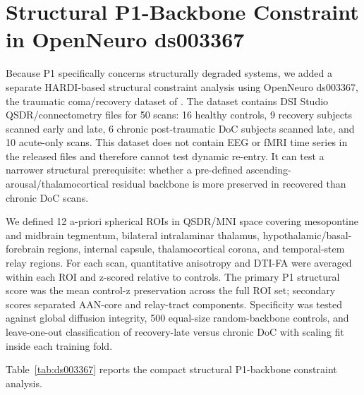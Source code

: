 \documentclass[11pt,a4paper]{article}
\theoremstyle{plain}
\theoremstyle{definition}
\theoremstyle{remark}
\begin{document}
\section{Structural P1-Backbone Constraint in OpenNeuro ds003367}
\label{sec:structural-p1}

Because P1 specifically concerns structurally degraded systems, we added a separate HARDI-based structural constraint analysis using OpenNeuro ds003367, the traumatic coma/recovery dataset of \citet{snider2020,snideropenneuro2020}. The dataset contains DSI Studio QSDR/connectometry files for 50 scans: 16 healthy controls, 9 recovery subjects scanned early and late, 6 chronic post-traumatic DoC subjects scanned late, and 10 acute-only scans. This dataset does not contain EEG or fMRI time series in the released files and therefore cannot test dynamic re-entry. It can test a narrower structural prerequisite: whether a pre-defined ascending-arousal/thalamocortical residual backbone is more preserved in recovered than chronic DoC scans.

We defined 12 a-priori spherical ROIs in QSDR/MNI space covering mesopontine and midbrain tegmentum, bilateral intralaminar thalamus, hypothalamic/basal-forebrain regions, internal capsule, thalamocortical corona, and temporal-stem relay regions. For each scan, quantitative anisotropy and DTI-FA were averaged within each ROI and z-scored relative to controls. The primary P1 structural score was the mean control-z preservation across the full ROI set; secondary scores separated AAN-core and relay-tract components. Specificity was tested against global diffusion integrity, 500 equal-size random-backbone controls, and leave-one-out classification of recovery-late versus chronic DoC with scaling fit inside each training fold.

Table~\ref{tab:ds003367} reports the compact structural P1-backbone constraint analysis.
\end{document}
